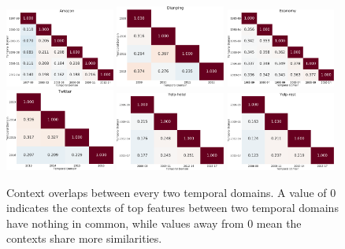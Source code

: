\begin{figure}[tb!]
\centering
\includegraphics[width=0.32\textwidth]{images/chapter3/ctt_shift/amazon.pdf}
\includegraphics[width=0.32\textwidth]{images/chapter3/ctt_shift/dianping.pdf}
\includegraphics[width=0.32\textwidth]{images/chapter3/ctt_shift/economy.pdf}
\newline
\includegraphics[width=0.32\textwidth]{images/chapter3/ctt_shift/vaccine.pdf}
\includegraphics[width=0.32\textwidth]{images/chapter3/ctt_shift/yelp_hotel.pdf}
\includegraphics[width=0.32\textwidth]{images/chapter3/ctt_shift/yelp_rest.pdf}
\caption{Context overlaps between every two temporal domains. A value of 0 indicates the contexts of top features between two temporal domains have nothing in common, while values away from 0 mean the contexts share more similarities.}
\label{chap3:fig:ctt}
\end{figure}

